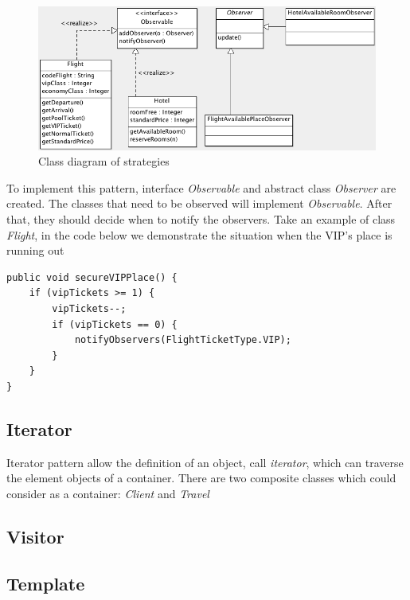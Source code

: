 \begin{figure}[h]
\centering
\includegraphics[width=12cm]{project/images/observer.png}
\caption{Class diagram of strategies}
\end{figure}

To implement this pattern, interface \textit{Observable} and abstract class \textit{Observer} are created. The classes that need to be observed will implement \textit{Observable}. After that, they should decide when to notify the observers. Take an example of class \textit{Flight}, in the code below we demonstrate the situation when the VIP's place is running out

\begin{lstlisting}
public void secureVIPPlace() {
	if (vipTickets >= 1) {
		vipTickets--;
		if (vipTickets == 0) {
			notifyObservers(FlightTicketType.VIP);
		}
	}
}
\end{lstlisting}

\newpage
\subsection{Iterator}
Iterator pattern allow the definition of an object, call \textit{iterator}, which can traverse the element objects of a container. There are two composite classes which could consider as a container: \textit{Client} and \textit{Travel}

\subsection{Visitor}

\subsection{Template}